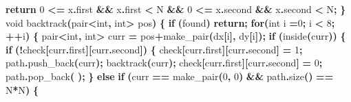 \documentclass[
]{article}
\newenvironment{Shaded}{\begin{snugshade}}{\end{snugshade}}
\newcommand{\ControlFlowTok}[1]{\textcolor[rgb]{0.13,0.29,0.53}{\textbf{#1}}}
\newcommand{\DataTypeTok}[1]{\textcolor[rgb]{0.13,0.29,0.53}{#1}}
\newcommand{\DecValTok}[1]{\textcolor[rgb]{0.00,0.00,0.81}{#1}}
\newcommand{\NormalTok}[1]{#1}
\newcommand{\OperatorTok}[1]{\textcolor[rgb]{0.81,0.36,0.00}{\textbf{#1}}}
\begin{document}
\begin{Shaded}
\begin{Highlighting}[]
    \ControlFlowTok{return} \DecValTok{0} \OperatorTok{\textless{}=}\NormalTok{ x}\OperatorTok{.}\NormalTok{first }\OperatorTok{\&\&}\NormalTok{ x}\OperatorTok{.}\NormalTok{first }\OperatorTok{\textless{}}\NormalTok{ N }\OperatorTok{\&\&} \DecValTok{0} \OperatorTok{\textless{}=}\NormalTok{ x}\OperatorTok{.}\NormalTok{second }\OperatorTok{\&\&}\NormalTok{ x}\OperatorTok{.}\NormalTok{second }\OperatorTok{\textless{}}\NormalTok{ N}\OperatorTok{;}
\OperatorTok{\}}
\DataTypeTok{void}\NormalTok{ backtrack}\OperatorTok{(}\NormalTok{pair}\OperatorTok{\textless{}}\DataTypeTok{int}\OperatorTok{,} \DataTypeTok{int}\OperatorTok{\textgreater{}}\NormalTok{ pos}\OperatorTok{)} \OperatorTok{\{}
    \ControlFlowTok{if} \OperatorTok{(}\NormalTok{found}\OperatorTok{)} \ControlFlowTok{return}\OperatorTok{;}
    \ControlFlowTok{for}\OperatorTok{(}\DataTypeTok{int}\NormalTok{ i }\OperatorTok{=}\DecValTok{0}\OperatorTok{;}\NormalTok{ i }\OperatorTok{\textless{}} \DecValTok{8}\OperatorTok{;} \OperatorTok{++}\NormalTok{i}\OperatorTok{)} \OperatorTok{\{}
\NormalTok{        pair}\OperatorTok{\textless{}}\DataTypeTok{int}\OperatorTok{,} \DataTypeTok{int}\OperatorTok{\textgreater{}}\NormalTok{ curr }\OperatorTok{=}\NormalTok{ pos}\OperatorTok{+}\NormalTok{make\_pair}\OperatorTok{(}\NormalTok{dx}\OperatorTok{[}\NormalTok{i}\OperatorTok{],}\NormalTok{ dy}\OperatorTok{[}\NormalTok{i}\OperatorTok{]);}
        \ControlFlowTok{if} \OperatorTok{(}\NormalTok{inside}\OperatorTok{(}\NormalTok{curr}\OperatorTok{))} \OperatorTok{\{}
            \ControlFlowTok{if} \OperatorTok{(!}\NormalTok{check}\OperatorTok{[}\NormalTok{curr}\OperatorTok{.}\NormalTok{first}\OperatorTok{][}\NormalTok{curr}\OperatorTok{.}\NormalTok{second}\OperatorTok{])} \OperatorTok{\{}
\NormalTok{                check}\OperatorTok{[}\NormalTok{curr}\OperatorTok{.}\NormalTok{first}\OperatorTok{][}\NormalTok{curr}\OperatorTok{.}\NormalTok{second}\OperatorTok{]} \OperatorTok{=} \DecValTok{1}\OperatorTok{;}
\NormalTok{                path}\OperatorTok{.}\NormalTok{push\_back}\OperatorTok{(}\NormalTok{curr}\OperatorTok{);}
\NormalTok{                backtrack}\OperatorTok{(}\NormalTok{curr}\OperatorTok{);}
\NormalTok{                check}\OperatorTok{[}\NormalTok{curr}\OperatorTok{.}\NormalTok{first}\OperatorTok{][}\NormalTok{curr}\OperatorTok{.}\NormalTok{second}\OperatorTok{]} \OperatorTok{=} \DecValTok{0}\OperatorTok{;}
\NormalTok{                path}\OperatorTok{.}\NormalTok{pop\_back}\OperatorTok{(} \OperatorTok{);}
            \OperatorTok{\}}
            \ControlFlowTok{else} \ControlFlowTok{if} \OperatorTok{(}\NormalTok{curr }\OperatorTok{==}\NormalTok{ make\_pair}\OperatorTok{(}\DecValTok{0}\OperatorTok{,} \DecValTok{0}\OperatorTok{)} \OperatorTok{\&\&}\NormalTok{ path}\OperatorTok{.}\NormalTok{size}\OperatorTok{()} \OperatorTok{==}\NormalTok{ N}\OperatorTok{*}\NormalTok{N}\OperatorTok{)} \OperatorTok{\{}

\end{Highlighting}
\end{Shaded}
\end{document}
